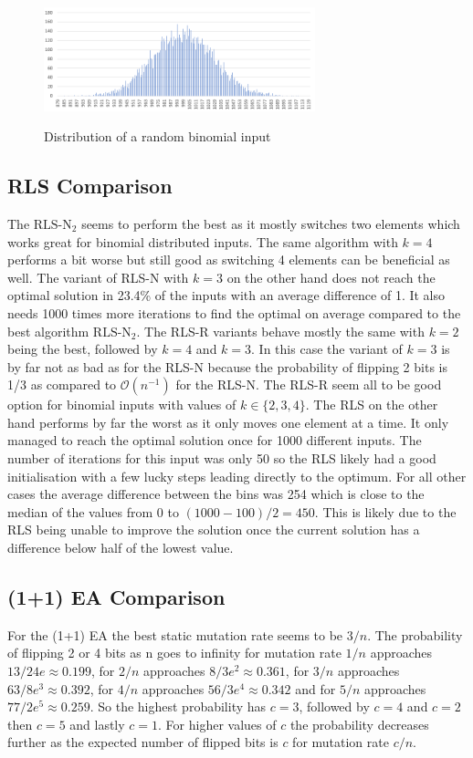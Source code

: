 \begin{figure}[h]
      \caption{Distribution of a random binomial input}
      \centering
      \includegraphics[width=0.7\textwidth]{figures/images/numberGenerator/binomialDistributionForN10000p0_1.png}\label{fig:binDistExample}
\end{figure}
\subsection{RLS Comparison}




The $\text{RLS-N}_2$ seems to perform the best as it mostly switches two elements which works great for binomial distributed inputs. 
The same algorithm with $k=4$ performs a bit worse but still good as switching 4 elements can be beneficial as well.
The variant of RLS-N with $k=3$ on the other hand does not reach the optimal solution in 23.4\% of the inputs with an average difference of 1.
It also needs 1000 times more iterations to find the optimal on average compared to the best algorithm $\text{RLS-N}_2$.
The RLS-R variants behave mostly the same with $k=2$ being the best, followed by $k=4$ and $k=3$.
In this case the variant of $k=3$ is by far not as bad as for the RLS-N because the probability of flipping 2 bits is 1/3 as compared to $\mathcal{O}(n^{-1})$ for the RLS-N.
The RLS-R seem all to be good option for binomial inputs with values of $k\in\{2,3,4\}$.
The RLS on the other hand performs by far the worst as it only moves one element at a time.
It only managed to reach the optimal solution once for 1000 different inputs.
The number of iterations for this input was only 50 so the RLS likely had a good initialisation with a few lucky steps leading directly to the optimum.
For all other cases the average difference between the bins was 254 which is close to the median of the values from 0 to $(1000-100)/2=450$.
This is likely due to the RLS being unable to improve the solution once the current solution has a difference below half of the lowest value.
\subsection{(1+1) EA Comparison}
For the (1+1) EA the best static mutation rate seems to be $3/n$. 
The probability of flipping 2 or 4 bits as n goes to infinity for mutation rate $1/n$ approaches $13/24e\approx 0.199$, for $2/n$ approaches $8/3e^2\approx 0.361$, for $3/n$ approaches $63/8e^3\approx 0.392$, for $4/n$ approaches $56/3e^4\approx 0.342$ and for $5/n$ approaches $77/2e^5\approx 0.259$. So the highest probability has $c=3$, followed by $c=4$ and $c=2$ then $c=5$ and lastly $c=1$. For higher values of $c$ the probability decreases further as the expected number of flipped bits is $c$ for mutation rate $c/n$.

